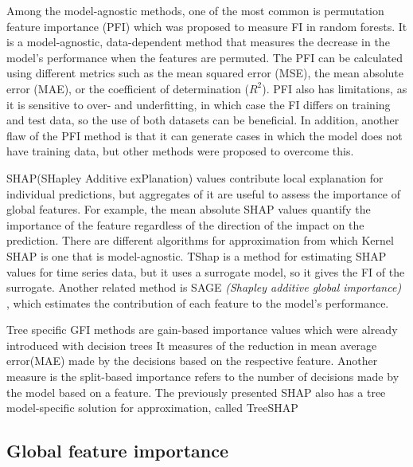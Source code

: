 Among the model-agnostic methods, one of the most common is permutation feature importance (PFI) which was proposed to measure FI in random forests\cite{Breiman2001}.
It is a model-agnostic, data-dependent method that measures the decrease in the model's performance when the features are permuted.
The PFI can be calculated using different metrics such as the mean squared error (MSE), the mean absolute error (MAE), or the coefficient of determination ($R^2$).
PFI also has limitations, as it is sensitive to over- and underfitting\cite{molnar2020limitations}, in which case the FI differs on training and test data, so the use of both datasets can be beneficial.
In addition, another flaw of the PFI method is that it can generate cases in which the model does not have training data\cite{Molnar_2020_pitfalls,giles_hooker_unrestricted_2021},
but other methods were proposed to overcome this\cite{ian_covert_understanding_2020, kristin_blesch_conditional_2023}.

SHAP(SHapley Additive exPlanation)\cite{scott_lundberg_unified_2017} values contribute local explanation for individual predictions, but aggregates of it are useful to assess the importance of global features.
For example, the mean absolute SHAP values quantify the importance of the feature regardless of the direction of the impact on the prediction.
There are different algorithms for approximation from which Kernel SHAP\cite{scott_lundberg_unified_2017} is one that is model-agnostic.
TShap \cite{vikas_c_raykar_tsshap_2023} is a method for estimating SHAP values for time series data, but it uses a surrogate model, so it gives the FI of the surrogate.
Another related method is SAGE \emph{(Shapley additive global importance)} \cite{ian_covert_understanding_2020}, which estimates the contribution of each feature to the model's performance.

Tree specific GFI methods are gain-based importance values which were already introduced with decision trees \cite{gordon_classification_1984}
It measures of the reduction in mean average error(MAE) made by the decisions based on the respective feature.
Another measure is the split-based importance\cite{tianqi_chen_xgboost_2016} refers to the number of decisions made by the model based on a feature.
The previously presented SHAP also has a tree model-specific solution for approximation, called TreeSHAP \cite{scott_lundberg_local_2020}

\subsection{Global feature importance}

